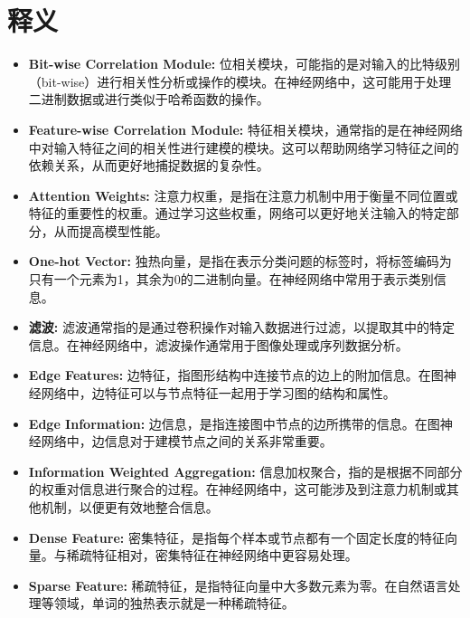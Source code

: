 \documentclass{article}
\begin{document}
\section*{释义}
\begin{itemize}
    \item \textbf{Bit-wise Correlation Module:} 位相关模块，可能指的是对输入的比特级别（bit-wise）进行相关性分析或操作的模块。在神经网络中，这可能用于处理二进制数据或进行类似于哈希函数的操作。

\item \textbf{Feature-wise Correlation Module:} 特征相关模块，通常指的是在神经网络中对输入特征之间的相关性进行建模的模块。这可以帮助网络学习特征之间的依赖关系，从而更好地捕捉数据的复杂性。

\item \textbf{Attention Weights:} 注意力权重，是指在注意力机制中用于衡量不同位置或特征的重要性的权重。通过学习这些权重，网络可以更好地关注输入的特定部分，从而提高模型性能。

\item \textbf{One-hot Vector:} 独热向量，是指在表示分类问题的标签时，将标签编码为只有一个元素为1，其余为0的二进制向量。在神经网络中常用于表示类别信息。

\item \textbf{滤波:} 滤波通常指的是通过卷积操作对输入数据进行过滤，以提取其中的特定信息。在神经网络中，滤波操作通常用于图像处理或序列数据分析。

\item \textbf{Edge Features:} 边特征，指图形结构中连接节点的边上的附加信息。在图神经网络中，边特征可以与节点特征一起用于学习图的结构和属性。

\item \textbf{Edge Information:} 边信息，是指连接图中节点的边所携带的信息。在图神经网络中，边信息对于建模节点之间的关系非常重要。

\item \textbf{Information Weighted Aggregation:} 信息加权聚合，指的是根据不同部分的权重对信息进行聚合的过程。在神经网络中，这可能涉及到注意力机制或其他机制，以便更有效地整合信息。

\item \textbf{Dense Feature:} 密集特征，是指每个样本或节点都有一个固定长度的特征向量。与稀疏特征相对，密集特征在神经网络中更容易处理。

\item \textbf{Sparse Feature:} 稀疏特征，是指特征向量中大多数元素为零。在自然语言处理等领域，单词的独热表示就是一种稀疏特征。


\end{itemize}
\end{document}
